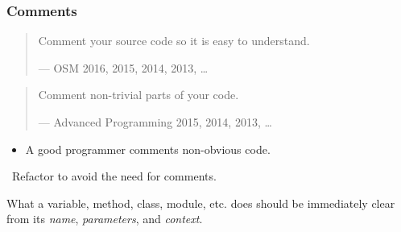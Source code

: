 \begin{frame}

\frametitle{Comments}

\begin{quotation}

\footnotesize\sffamily\itshape

\begin{flushright}

Comment your source code so it is easy to understand.

\smallbreak

\upshape

--- OSM 2016, 2015, 2014, 2013, \ldots

\end{flushright}

\end{quotation}

\pause

\begin{quotation}

\footnotesize\sffamily\itshape

\begin{flushright}

Comment non-trivial parts of your code.

\smallbreak

\upshape

--- Advanced Programming 2015, 2014, 2013, \ldots

\end{flushright}

\end{quotation}

\begin{itemize}

\item A good programmer comments non-obvious code.

\end{itemize}

\pause

\vspace{\fill}

\begin{center}

\leftthumbsup~Refactor to avoid the need for comments.~\rightthumbsup

\end{center}

\vspace{\fill}

\begin{center}

What a variable, method, class, module, etc. does should be immediately
clear from its \emph{name}, \emph{parameters}, and \emph{context}.

\end{center}

\end{frame}

